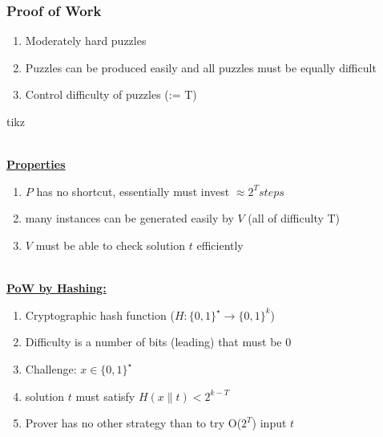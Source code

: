 \documentclass{article}
\begin{document}
\begin{adjustwidth}{2em}{2em}
\begin{adjustwidth}{2em}{2em}
			\subsubsection{Proof of Work}
			\begin{adjustwidth}{2em}{}
				\begin{enumerate}[-]
					\item Moderately hard puzzles
					\item Puzzles can be produced easily and all puzzles must be equally difficult 
					\item Control difficulty of puzzles (:= T)
				\end{enumerate}
				\begin{center}
					tikz
				\end{center}
				\hfill \\
				\underline{\textbf{Properties}}
				\begin{adjustwidth}{1em}{}
					\begin{enumerate}[1)]
						\item $P$ has no shortcut, essentially must invest $\approx 2^T steps$
						\item many instances can be generated easily by $V$ (all of difficulty T)
						\item $V$ must be able to check solution $t$ efficiently
					\end{enumerate}
				\end{adjustwidth}
				\hfill \\ 
				\underline{\textbf{PoW by Hashing:}}
				\begin{adjustwidth}{1em}{}
					\begin{enumerate}[-]
						\item Cryptographic hash function ($H:\{ 0,1 \}^{\star} \rightarrow \{ 0,1 \}^k$)
						\item Difficulty is a number of bits (leading) that must be $0$
						\item Challenge: $x \in \{ 0,1\}^{\star}$
						\item solution $t$ must satisfy $H(x \| t) < 2^{k-T}$
						\item Prover has no other strategy than to try O($2^T$) input $t$
					\end{enumerate}
				\end{adjustwidth}
			\end{adjustwidth}
		\end{adjustwidth}
	\end{adjustwidth}
	
\end{document}
